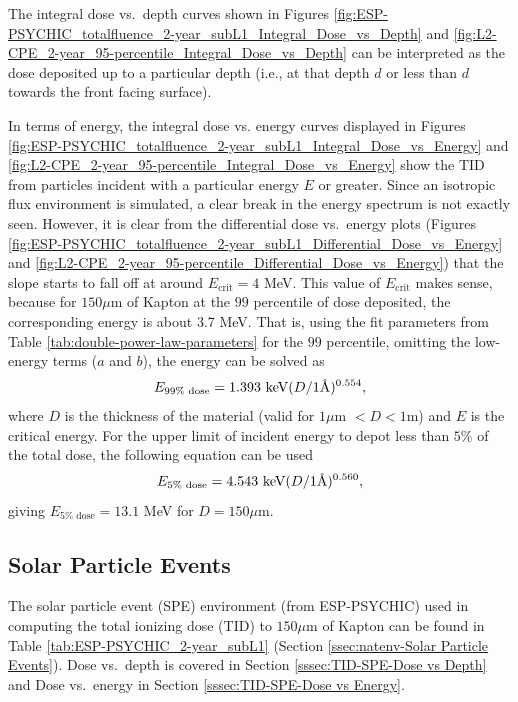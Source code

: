 \documentclass{hitec}
\newcommand{\angstrom}{\mbox{\normalfont\AA}}
\begin{document}
The integral dose vs.\ depth curves shown in Figures \ref{fig:ESP-PSYCHIC_totalfluence_2-year_subL1_Integral_Dose_vs_Depth} and \ref{fig:L2-CPE_2-year_95-percentile_Integral_Dose_vs_Depth} can be interpreted as the dose deposited up to a particular depth (i.e., at that depth $d$ or less than $d$ towards the front facing surface).

In terms of energy, the integral dose vs. energy curves displayed in Figures \ref{fig:ESP-PSYCHIC_totalfluence_2-year_subL1_Integral_Dose_vs_Energy} and \ref{fig:L2-CPE_2-year_95-percentile_Integral_Dose_vs_Energy} show the TID from particles incident with a particular energy $E$ or greater. Since an isotropic flux environment is simulated, a clear break in the energy spectrum is not exactly seen. However, it is clear from the differential dose vs.\ energy plots (Figures \ref{fig:ESP-PSYCHIC_totalfluence_2-year_subL1_Differential_Dose_vs_Energy} and \ref{fig:L2-CPE_2-year_95-percentile_Differential_Dose_vs_Energy}) that the slope starts to fall off at around $E_{\text{crit}}=4$ MeV. This value of  $E_{\text{crit}}$ makes sense, because for $150 \mu$m of Kapton at the $99$ percentile of dose deposited, the corresponding energy is about 3.7 MeV. That is, using the fit parameters from Table \ref{tab:double-power-law-parameters} for the $99$ percentile, omitting the low-energy terms ($a$ and $b$), the energy can be solved as
\begin{equation}
	E_{99\% \text{ dose}} = 1.393 \text{ keV} (D/ 1 \angstrom)^{0.554},
\end{equation}
where $D$ is the thickness of the material (valid for $1 \mu$m $< D < 1$m) and $E$ is the critical energy. For the upper limit of incident energy to depot less than $5\%$ of the total dose, the following equation can be used
\begin{equation}
	E_{5\% \text{ dose}} = 4.543 \text{ keV} (D/ 1 \angstrom)^{0.560},
\end{equation}
giving $E_{5\% \text{ dose}} = 13.1$ MeV for $D = 150\mu$m.


\subsection{Solar Particle Events}
\label{ssec:TID-Solar Particle Events}

The solar particle event (SPE) environment (from ESP-PSYCHIC) used in computing the total ionizing dose (TID) to $150 \mu$m of Kapton can be found in Table \ref{tab:ESP-PSYCHIC_2-year_subL1} (Section \ref{ssec:natenv-Solar Particle Events}).  Dose vs.\ depth is covered in Section \ref{sssec:TID-SPE-Dose vs Depth} and Dose vs.\ energy in Section \ref{sssec:TID-SPE-Dose vs Energy}.
\end{document}
